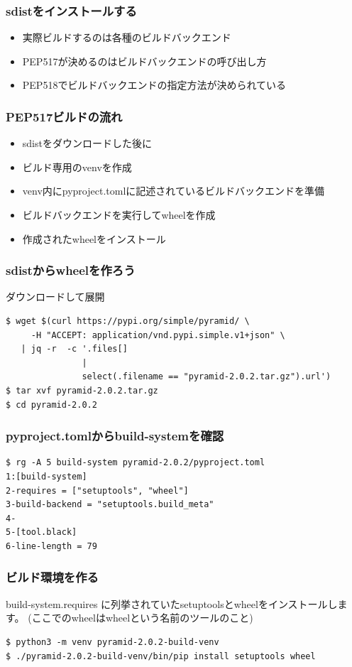 \documentclass[aspectratio=169]{beamer}
\begin{document}
\begin{frame}
\frametitle{sdistをインストールする}
\begin{itemize}
\item 実際ビルドするのは各種のビルドバックエンド
\item PEP517が決めるのはビルドバックエンドの呼び出し方
\item PEP518でビルドバックエンドの指定方法が決められている
\end{itemize}
\end{frame}

\begin{frame}
\frametitle{PEP517ビルドの流れ}
\begin{itemize}
\item sdistをダウンロードした後に
\item ビルド専用のvenvを作成
\item venv内にpyproject.tomlに記述されているビルドバックエンドを準備
\item ビルドバックエンドを実行してwheelを作成
\item 作成されたwheelをインストール
\end{itemize}
\end{frame}

\begin{frame}[fragile]
\frametitle{sdistからwheelを作ろう}
ダウンロードして展開
\begin{lstlisting}
$ wget $(curl https://pypi.org/simple/pyramid/ \
     -H "ACCEPT: application/vnd.pypi.simple.v1+json" \
   | jq -r  -c '.files[] 
               |
               select(.filename == "pyramid-2.0.2.tar.gz").url')
$ tar xvf pyramid-2.0.2.tar.gz
$ cd pyramid-2.0.2
\end{lstlisting}
\end{frame}

\begin{frame}[fragile]
\frametitle{pyproject.tomlからbuild-systemを確認}
\begin{lstlisting}
$ rg -A 5 build-system pyramid-2.0.2/pyproject.toml
1:[build-system]
2-requires = ["setuptools", "wheel"]
3-build-backend = "setuptools.build_meta"
4-
5-[tool.black]
6-line-length = 79
\end{lstlisting}
\end{frame}

\begin{frame}[fragile]
\frametitle{ビルド環境を作る}
build-system.requires に列挙されていたsetuptoolsとwheelをインストールします。
(ここでのwheelはwheelという名前のツールのこと)
\begin{lstlisting}
$ python3 -m venv pyramid-2.0.2-build-venv
$ ./pyramid-2.0.2-build-venv/bin/pip install setuptools wheel
\end{lstlisting}
\end{frame}
\end{document}

